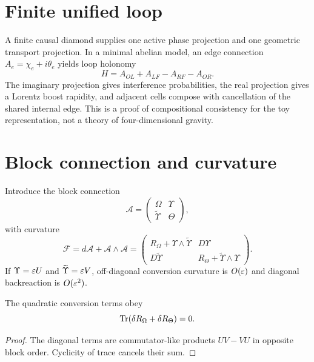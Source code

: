\documentclass[11pt,a4paper]{article}
\begin{document}
\section{Finite unified loop}
A finite causal diamond supplies one active phase projection and one geometric transport projection. In a minimal abelian model, an edge connection $A_e=\chi_e+i\theta_e$ yields loop holonomy
\begin{equation}
H=A_{OL}+A_{LF}-A_{RF}-A_{OR}.
\end{equation}
The imaginary projection gives interference probabilities, the real projection gives a Lorentz boost rapidity, and adjacent cells compose with cancellation of the shared internal edge. This is a proof of compositional consistency for the toy representation, not a theory of four-dimensional gravity.

\section{Block connection and curvature}
Introduce the block connection
\begin{equation}
\mathcal A=\begin{pmatrix}\Omega&\Upsilon\\\widetilde\Upsilon&\Theta\end{pmatrix},
\end{equation}
with curvature
\begin{equation}
\mathcal F=d\mathcal A+\mathcal A\wedge\mathcal A
=\begin{pmatrix}
R_\Omega+\Upsilon\wedge\widetilde\Upsilon&D\Upsilon\\
D\widetilde\Upsilon&R_\Theta+\widetilde\Upsilon\wedge\Upsilon
\end{pmatrix}.
\end{equation}
If $\Upsilon=\varepsilon U$ and $\widetilde\Upsilon=\varepsilon V$, off-diagonal conversion curvature is $O(\varepsilon)$ and diagonal backreaction is $O(\varepsilon^2)$.

\begin{theorem}
The quadratic conversion terms obey
\begin{equation}
\operatorname{Tr}(\delta R_\Omega+\delta R_\Theta)=0.
\end{equation}
\end{theorem}
\begin{proof}
The diagonal terms are commutator-like products $UV-VU$ in opposite block order. Cyclicity of trace cancels their sum.
\end{proof}
\end{document}
